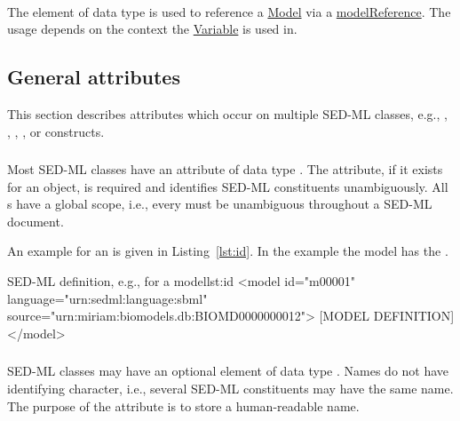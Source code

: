 \paragraph*{}
\label{sec:modelReferenceAttribute}
The  element of data type \hyperref[type:sidref]{} is used to reference a \hyperref[class:model]{Model} via a \hyperref[sec:modelReference]{modelReference}. The usage depends on the context the \hyperref[class:variable]{Variable} is used in.


\subsection{General attributes}
This section describes attributes which occur on multiple SED-ML classes, e.g., \hyperref[sec:id]{}, \hyperref[sec:name]{}, \hyperref[sec:math]{}, \hyperref[sec:kisaoid]{}, or \hyperref[sec:listOf]{} constructs.
\label{sec:generalAttributes}

\subsubsection{}
\label{sec:id}
Most SED-ML classes have an  attribute of data type \hyperref[type:sid]{}. The  attribute, if it exists for an object, is required and identifies SED-ML constituents unambiguously. All s have a global scope, i.e., every  must be unambiguous throughout a SED-ML document.

An example for an  is given in Listing~\ref{lst:id}. In the example the model has the  .

\begin{myXmlLst}{SED-ML  definition, e.g., for a model}{lst:id}
<model id="m00001" language="urn:sedml:language:sbml" source="urn:miriam:biomodels.db:BIOMD0000000012">
	[MODEL DEFINITION]
</model>
\end{myXmlLst}


\subsubsection{}
\label{sec:name}
SED-ML classes may have an optional element  of data type . Names do not have identifying character, i.e., several SED-ML constituents may have the same name. The purpose of the  attribute is to store a human-readable name.

